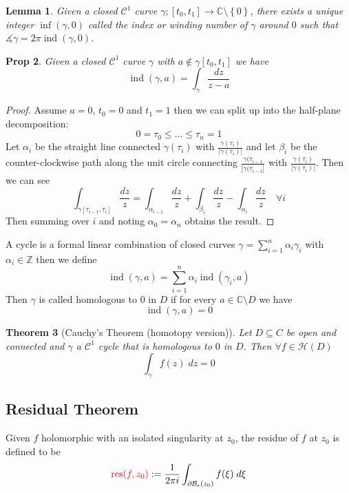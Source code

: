 \documentclass[11pt]{article}
\newcommand{\defeq}{:=}
\newcommand{\abs}[1]{\left|#1\right|}
\DeclareMathOperator{\ind}{\text{ind}}
\DeclareMathOperator{\res}{\text{res}}
\newcommand{\C}{\mathbb{C}}
\newcommand{\Z}{\mathbb{Z}}
\newenvironment{defin}
	{\begin{mdframed}[backgroundcolor=white, roundcorner=5pt, linewidth=1pt]}
	{\end{mdframed}}
\newcommand{\mdf}[1]{{\color{red} #1}}
\newtheorem{theorem}{Theorem}[section]
\newtheorem{prop}[theorem]{Prop}
\newtheorem{lemma}[theorem]{Lemma}
\begin{document}
\begin{lemma}
Given a closed $\mathcal{C}^1$ curve $\gamma;[t_0, t_1]\to\C\setminus\left\{0\right\}$, there exists a unique integer \mdf{$\inf(\gamma,0)$} called the \mdf{index} or \mdf{winding number} of $\gamma$ around $0$ such that $\measuredangle\gamma=2\pi \ind(\gamma, 0)$.
\end{lemma}

\begin{prop}
Given a closed $\mathcal{C}^1$ curve $\gamma$ with $a\not\in\gamma[t_0, t_1]$ we have
\[
	\ind(\gamma, a)=\int_\gamma\frac{dz}{z-a}
\]
\end{prop}

\begin{proof}
Assume $a=0$, $t_0=0$ and $t_1=1$ then we can split up into the half-plane decomposition: 
\[
0=\tau_0 \leq \dots \leq \tau_n =1
\]
Let $\alpha_i$ be the straight line connected $\gamma(\tau_i)$ with $\frac{\gamma(\tau_i)}{\abs{\gamma(\tau_i)}}$ and let $\beta_i$ be the counter-clockwise path along the unit circle connecting $\frac{\gamma(\tau_{i-1}}{\abs{\gamma(\tau_{i-1}}}$ with $\frac{\gamma(\tau_i)}{\abs{\gamma(\tau_i)}}$.
Then we can see
\[
	\int_{\gamma[\tau_{i-1}, \tau_i]}\frac{dz}{z}=\int_{\alpha_{i-1}}\frac{dz}{z}+\int_{\beta_i}\frac{dz}{z}-\int_{\alpha_i}\frac{dz}{z}\quad\forall i
\]
Then summing over $i$ and noting $\alpha_0=\alpha_n$ obtains the result.
\end{proof}

\begin{defin}
	A \mdf{cycle} is a formal linear combination of closed curves $\gamma=\sum_{i=1}^{n}\alpha_i\gamma_i$ with $\alpha_i\in\Z$ then we define
	\[
		\ind(\gamma,a)=\sum_{i=1}^{n}\alpha_i\ind(\gamma_i, a)
	\]
	Then $\gamma$ is called \mdf{homologous to $0$ in $D$} if for every $a\in\C\setminus D$ we have
	\[
		\ind(\gamma, a)=0
	\]
\end{defin}

\begin{theorem}[Cauchy's Theorem (homotopy version)]
Let $D\subseteq C$ be open and connected and $\gamma$ a $\mathcal{C}^1$ cycle that is homologous to $0$ in $D$.
Then $\forall f\in\mathcal{H}(D)$
\[
	\int_\gamma f(z)\;dz=0
\]
\end{theorem}

\subsection{Residual Theorem}

\begin{defin}
	Given $f$ holomorphic with an isolated singularity at $z_0$, the \mdf{residue of $f$ at $z_0$} is defined to be
	\[
		\mdf{\res(f,z_0)}\defeq\frac{1}{2\pi i}\int_{\partial \mathcal{B}_\epsilon(z_0)}f(\xi)\;d\xi
	\]
\end{defin}
\end{document}
